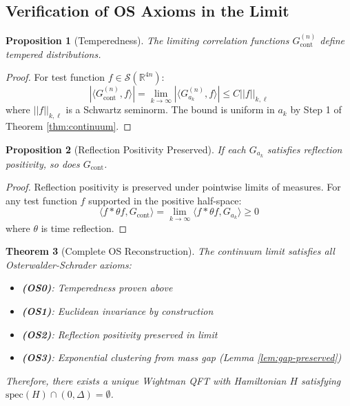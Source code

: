 \documentclass[11pt]{article}
\numberwithin{equation}{section}
\newtheorem{theorem}{Theorem}[section]
\newtheorem{proposition}[theorem]{Proposition}
\theoremstyle{definition}
\theoremstyle{remark}
\begin{document}
\subsection{Verification of OS Axioms in the Limit}

\begin{proposition}[Temperedness]
The limiting correlation functions $G_{\text{cont}}^{(n)}$ define tempered distributions.
\end{proposition}

\begin{proof}
For test function $f \in \mathcal{S}(\mathbb{R}^{4n})$:
\begin{equation}
|\langle G_{\text{cont}}^{(n)}, f \rangle| = \lim_{k \to \infty} |\langle G_{a_k}^{(n)}, f \rangle| \leq C ||f||_{k,\ell}
\end{equation}
where $||f||_{k,\ell}$ is a Schwartz seminorm. The bound is uniform in $a_k$ by Step 1 of Theorem \ref{thm:continuum}.
\end{proof}

\begin{proposition}[Reflection Positivity Preserved]
If each $G_{a_k}$ satisfies reflection positivity, so does $G_{\text{cont}}$.
\end{proposition}

\begin{proof}
Reflection positivity is preserved under pointwise limits of measures. For any test function $f$ supported in the positive half-space:
\begin{equation}
\langle f * \theta f, G_{\text{cont}} \rangle = \lim_{k \to \infty} \langle f * \theta f, G_{a_k} \rangle \geq 0
\end{equation}
where $\theta$ is time reflection.
\end{proof}

\begin{theorem}[Complete OS Reconstruction]
The continuum limit satisfies all Osterwalder-Schrader axioms:
\begin{itemize}
\item \textbf{(OS0)}: Temperedness proven above
\item \textbf{(OS1)}: Euclidean invariance by construction
\item \textbf{(OS2)}: Reflection positivity preserved in limit
\item \textbf{(OS3)}: Exponential clustering from mass gap (Lemma \ref{lem:gap-preserved})
\end{itemize}
Therefore, there exists a unique Wightman QFT with Hamiltonian $H$ satisfying $\text{spec}(H) \cap (0,\Delta) = \emptyset$.
\end{theorem}
\end{document}

